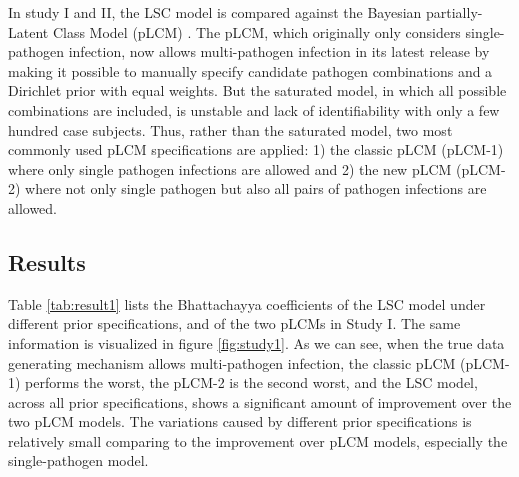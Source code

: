 \documentclass[11 pt, a4paper]{article}  %
\begin{document}
In study I and II, the LSC model is compared against the Bayesian partially-Latent Class Model (pLCM) \cite{wu2015partially}. The pLCM, which originally only considers single-pathogen infection, now allows multi-pathogen infection in its latest release by making it possible to manually specify candidate pathogen combinations and a Dirichlet prior with equal weights. But the saturated model, in which all possible combinations are included, is unstable and lack of identifiability with only a few hundred case subjects. Thus, rather than the saturated model, two most commonly used pLCM specifications are applied: 1) the classic pLCM (pLCM-1) where only single pathogen infections are allowed and 2) the new pLCM (pLCM-2) where not only single pathogen but also all pairs of pathogen infections are allowed.\\

\subsection{Results}
Table \ref{tab:result1} lists the Bhattachayya coefficients of the LSC model under different prior specifications, and of the two pLCMs in Study I. The same information is visualized in figure \ref{fig:study1}. As we can see, when the true data generating mechanism allows multi-pathogen infection, the classic pLCM (pLCM-1) performs the worst, the pLCM-2 is the second worst, and the LSC model, across all prior specifications, shows a significant amount of improvement over the two pLCM models. The variations caused by different prior specifications is relatively small comparing to the improvement over pLCM models, especially the single-pathogen model.\\
\end{document}
